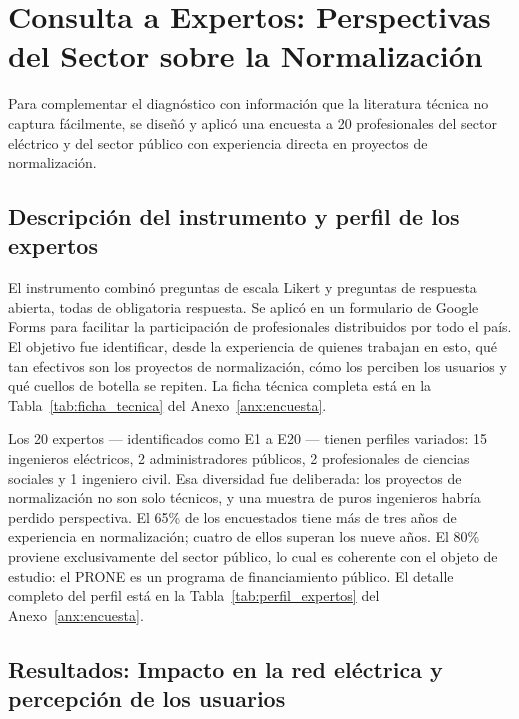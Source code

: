 \section{Consulta a Expertos: Perspectivas del Sector sobre la Normalización}
\label{sec:consulta_expertos}

Para complementar el diagnóstico con información que la literatura técnica no captura fácilmente, se diseñó y aplicó una encuesta a 20 profesionales del sector eléctrico y del sector público con experiencia directa en proyectos de normalización.

\subsection{Descripción del instrumento y perfil de los expertos}
\label{subsec:instrumento}

El instrumento combinó preguntas de escala Likert y preguntas de respuesta abierta, todas de obligatoria respuesta. Se aplicó en un formulario de Google Forms para facilitar la participación de profesionales distribuidos por todo el país. El objetivo fue identificar, desde la experiencia de quienes trabajan en esto, qué tan efectivos son los proyectos de normalización, cómo los perciben los usuarios y qué cuellos de botella se repiten. La ficha técnica completa está en la Tabla~\ref{tab:ficha_tecnica} del Anexo~\ref{anx:encuesta}.

Los 20 expertos — identificados como E1 a E20 — tienen perfiles variados: 15 ingenieros eléctricos, 2 administradores públicos, 2 profesionales de ciencias sociales y 1 ingeniero civil. Esa diversidad fue deliberada: los proyectos de normalización no son solo técnicos, y una muestra de puros ingenieros habría perdido perspectiva. El 65\% de los encuestados tiene más de tres años de experiencia en normalización; cuatro de ellos superan los nueve años. El 80\% proviene exclusivamente del sector público, lo cual es coherente con el objeto de estudio: el PRONE es un programa de financiamiento público. El detalle completo del perfil está en la Tabla~\ref{tab:perfil_expertos} del Anexo~\ref{anx:encuesta}.

\subsection{Resultados: Impacto en la red eléctrica y percepción de los usuarios}
\label{subsec:resultados_red}

